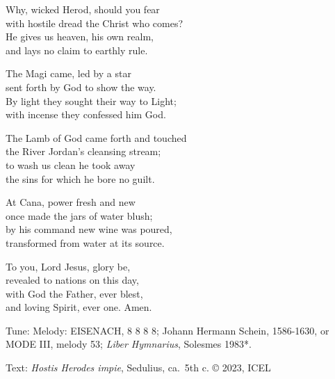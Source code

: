 \hymn

\settowidth{\versewidth}{with hostile dread the Christ who comes?}

\begin{hymnverse}%
Why, wicked Herod, should you fear\\
with hostile dread the Christ who comes?\\
He gives us heaven, his own realm,\\
and lays no claim to earthly rule.

The Magi came, led by a star\\
sent forth by God to show the way.\\
By light they sought their way to Light;\\
with incense they confessed him God.

The Lamb of God came forth and touched\\
the River Jordan’s cleansing stream;\\
to wash us clean he took away\\
the sins for which he bore no guilt.

At Cana, power fresh and new\\
once made the jars of water blush;\\
by his command new wine was poured,\\
transformed from water at its source.

To you, Lord Jesus, glory be,\\
revealed to nations on this day,\\
with God the Father, ever blest,\\
and loving Spirit, ever one. Amen.
\end{hymnverse}

\begin{hymnsource}
Tune: Melody: EISENACH, 8 8 8 8; Johann Hermann Schein, 1586-1630, or MODE III, melody 53; \emph{Liber Hymnarius}, Solesmes 1983*.

Text: \emph{Hostis Herodes impie}, Sedulius, ca.\ 5th c. © 2023, ICEL
\end{hymnsource}
